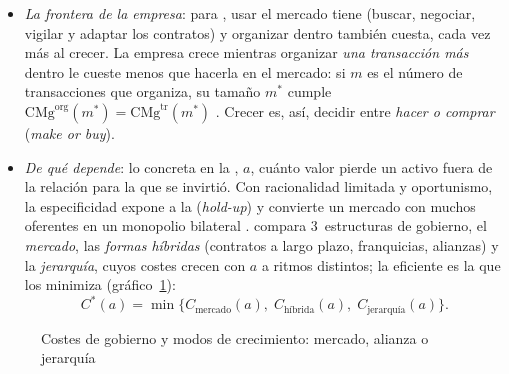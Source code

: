\documentclass[11pt]{article}
\begin{document}
\begin{itemize}
\item \emph{La frontera de la empresa}: para \textcite{Coase1937Nature}, usar el mercado tiene  (buscar, negociar, vigilar y adaptar los contratos) y organizar dentro también cuesta, cada vez más al crecer. La empresa crece mientras organizar \emph{una transacción más} dentro le cueste menos que hacerla en el mercado: si $m$ es el número de transacciones que organiza, su tamaño $m^{*}$ cumple $\mathrm{CMg}^{\mathrm{org}}(m^{*})=\mathrm{CMg}^{\mathrm{tr}}(m^{*})$ . Crecer es, así, decidir entre \emph{hacer o comprar} (\emph{make or buy}).
\item \emph{De qué depende}: \textcite{Williamson1979Transaction} lo concreta en la , $a$, cuánto valor pierde un activo fuera de la relación para la que se invirtió. Con racionalidad limitada y oportunismo, la especificidad expone a la  (\emph{hold-up}) y convierte un mercado con muchos oferentes en un monopolio bilateral . \textcite{Williamson1991Comparative} compara 3~estructuras de gobierno, el \emph{mercado}, las \emph{formas híbridas} (contratos a largo plazo, franquicias, alianzas) y la \emph{jerarquía}, cuyos costes crecen con $a$ a ritmos distintos; la eficiente es la que los minimiza (gráfico~\ref{fig:gobierno-crecimiento}):
  \[
  C^{*}(a)=\min\big\{C_{\text{mercado}}(a),\;C_{\text{híbrida}}(a),\;C_{\text{jerarquía}}(a)\big\}.
  \]
\end{itemize}

\begin{figure}[H]
\centering
\caption{Costes de gobierno y modos de crecimiento: mercado, alianza o jerarquía}\label{fig:gobierno-crecimiento}
\end{figure}
\end{document}
